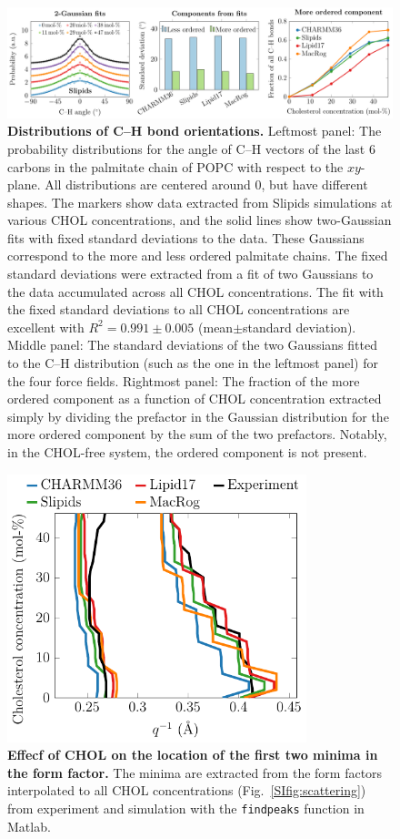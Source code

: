 \documentclass[journal=jpcbfk]{achemso}
\begin{document}
\begin{figure}[htb!]
    \centering
    \includegraphics[width=\linewidth]{../FIGS/CH.pdf}
    \caption{\label{SIfig:chdist}%
    \textbf{Distributions of C--H bond orientations.}
    Leftmost panel: The probability distributions for the angle of C--H vectors of the last 6 carbons in the palmitate chain of POPC with respect to the $xy$-plane. All distributions are centered around 0, but have different shapes. The markers show data extracted from Slipids simulations at various CHOL concentrations, and the solid lines show two-Gaussian fits with fixed standard deviations to the data. These Gaussians correspond to the more and less ordered palmitate chains. The fixed standard deviations were extracted from a fit of two Gaussians to the data accumulated across all CHOL concentrations. The fit with the fixed standard deviations to all CHOL concentrations are excellent with $R^2=0.991\pm 0.005$ (mean$\pm$standard deviation).
    Middle panel: The standard deviations of the two Gaussians fitted to the C--H distribution (such as the one in the leftmost panel) for the four force fields. 
    Rightmost panel: The fraction of the more ordered component as a function of CHOL concentration extracted simply by dividing the prefactor in the Gaussian distribution for the more ordered component by the sum of the two prefactors. Notably, in the CHOL-free system, the ordered component is not present.
    }
\end{figure}

\begin{figure}[htb!]
    \centering
    \includegraphics[width=8.7cm]{../FIGS/ffminima.pdf}
    \caption{\label{SIfig:ffminima}%
    \textbf{Effecf of CHOL on the location of the first two minima in the form factor.}
    The minima are extracted from the form factors interpolated to all CHOL concentrations (Fig.~\ref{SIfig:scattering}) from experiment and simulation with the \texttt{findpeaks} function in Matlab.
    }
\end{figure}

\clearpage


\end{document}
